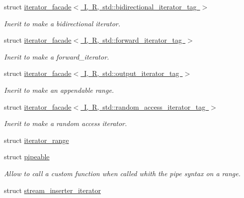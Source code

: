 \begin{DoxyCompactItemize}
\item 
struct \mbox{\hyperlink{structrah_1_1iterator__facade_3_01_i_00_01_r_00_01std_1_1bidirectional__iterator__tag_01_4}{iterator\+\_\+facade$<$ I, R, std\+::bidirectional\+\_\+iterator\+\_\+tag $>$}}
\begin{DoxyCompactList}\small\item\em Inerit to make a bidirectional iterator. \end{DoxyCompactList}\item 
struct \mbox{\hyperlink{structrah_1_1iterator__facade_3_01_i_00_01_r_00_01std_1_1forward__iterator__tag_01_4}{iterator\+\_\+facade$<$ I, R, std\+::forward\+\_\+iterator\+\_\+tag $>$}}
\begin{DoxyCompactList}\small\item\em Inerit to make a forward\+\_\+iterator. \end{DoxyCompactList}\item 
struct \mbox{\hyperlink{structrah_1_1iterator__facade_3_01_i_00_01_r_00_01std_1_1output__iterator__tag_01_4}{iterator\+\_\+facade$<$ I, R, std\+::output\+\_\+iterator\+\_\+tag $>$}}
\begin{DoxyCompactList}\small\item\em Inerit to make an appendable range. \end{DoxyCompactList}\item 
struct \mbox{\hyperlink{structrah_1_1iterator__facade_3_01_i_00_01_r_00_01std_1_1random__access__iterator__tag_01_4}{iterator\+\_\+facade$<$ I, R, std\+::random\+\_\+access\+\_\+iterator\+\_\+tag $>$}}
\begin{DoxyCompactList}\small\item\em Inerit to make a random access iterator. \end{DoxyCompactList}\item 
struct \mbox{\hyperlink{structrah_1_1iterator__range}{iterator\+\_\+range}}
\item 
struct \mbox{\hyperlink{structrah_1_1pipeable}{pipeable}}
\begin{DoxyCompactList}\small\item\em Allow to call a custom function when called whith the \textquotesingle{}pipe\textquotesingle{} syntax on a range. \end{DoxyCompactList}\item 
struct \mbox{\hyperlink{structrah_1_1stream__inserter__iterator}{stream\+\_\+inserter\+\_\+iterator}}
\end{DoxyCompactItemize}
